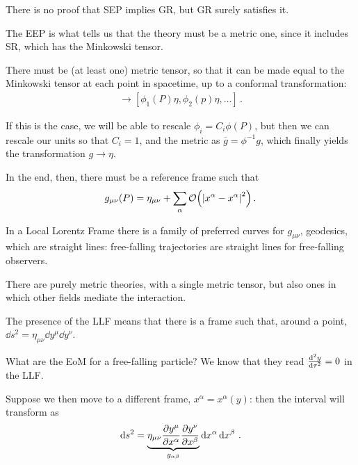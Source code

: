 \documentclass[main.tex]{subfiles}
\begin{document}
There is no proof that SEP implies GR, but GR surely satisfies it.

The EEP is what tells us that the theory must be a metric one, since it includes SR, which has the Minkowski tensor. 

There must be (at least one) metric tensor, so that it can be made equal to the Minkowski tensor at each point in spacetime, up to a conformal transformation: 
%
\begin{align}
[g_1, g_2 \dots ] \to [\phi_1 (P) \eta, \phi_2 (p) \eta,  \dots]
\,.
\end{align}

If this is the case, we will be able to rescale \(\phi _i = C_i \phi (P)\), but then we can rescale our units so that \(C_i = 1\), and the metric as \(\overline{g} = \phi^{-1} g\), which finally yields the transformation \(g \to \eta \). 

In the end, then, there must be a reference frame such that  
%
\begin{align}
 g_{\mu \nu } (P) = \eta_{\mu \nu } + \sum _{\alpha } \order{\abs{x^{\alpha } - x^{\alpha }}^2}
\,.
\end{align}

In a Local Lorentz Frame there is a family of preferred curves for \(g_{\mu \nu }\), geodesics, which are straight lines: free-falling trajectories are straight lines for free-falling observers. 

There are purely metric theories, with a single metric tensor, but also ones in which other fields mediate the interaction. 

The presence of the LLF means that there is a frame such that, around a point, \(\dd{s^2} = \eta_{\mu \nu } \dd{y^{\mu }} \dd{y^{\nu }}\). 

What are the EoM for a free-falling particle? 
We know that they read \(\dv[2]{y}{\tau } = 0\) in the LLF. 

Suppose we then move to a different frame, \(x^{\alpha } = x^{\alpha } (y)\): then the interval will transform as 
%
\begin{align}
\dd{s^2} = \underbrace{\eta_{\mu \nu } 
\pdv{y^{\mu }}{x^{\alpha }}
\pdv{y^{\nu }}{x^{\beta   }}}_{g_{\alpha \beta }}
\dd{x^{\alpha }} \dd{x^{\beta }}
\,.
\end{align}
\end{document}
